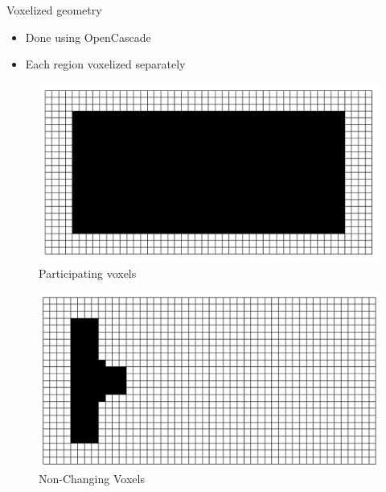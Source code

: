 
\begin{frame}{Voxelized geometry}
\begin{itemize}
\item Done using OpenCascade  
\item Each region voxelized separately 
\end{itemize}
\vspace{0.4cm}
\begin{minipage}{0.49\textwidth}
\begin{figure}
\includegraphics[width=.7\textwidth]{Pictures/Voxels/Active_2.png}
\vspace*{-2mm}
\caption{Participating voxels}
\end{figure}
\vspace{-0.6cm}
 \begin{figure}
\includegraphics[width=.7\textwidth]{Pictures/Voxels/NonChanging.png}
\vspace*{-2mm}
\caption{Non-Changing Voxels}
\end{figure}
\end{minipage}
\hfill

\end{frame}
